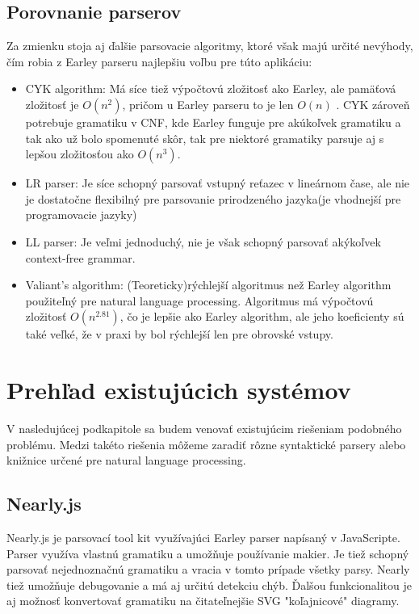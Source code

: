 \documentclass[12pt,a4paper]{report}
\theoremstyle{definition}
\theoremstyle{remark}
\begin{document}
\subsection{Porovnanie parserov}
Za zmienku stoja aj ďalšie parsovacie algoritmy, ktoré však majú určité nevýhody, čím robia z Earley parseru najlepšiu voľbu pre túto aplikáciu:
\begin{itemize}
\item CYK algorithm: Má síce tiež výpočtovú zložitosť ako Earley, ale pamäťová zložitosť je $O(n^2)$, pričom u Earley parseru to je len $O(n)$ \cite{complexity}. CYK zároveň potrebuje gramatiku v CNF, kde Earley funguje pre akúkoľvek gramatiku a tak ako už bolo spomenuté skôr, tak pre niektoré gramatiky parsuje aj s lepšou zložitosťou ako $O(n^3)$.
\item LR parser: Je síce schopný parsovať vstupný reťazec v lineárnom čase, ale nie je dostatočne flexibilný pre parsovanie prirodzeného jazyka(je vhodnejší pre programovacie jazyky)
\item LL parser: Je veľmi jednoduchý, nie je však schopný parsovať akýkoľvek context-free grammar.
\item Valiant’s algorithm: (Teoreticky)rýchlejší algoritmus než Earley algorithm použiteľný pre natural language processing. Algoritmus má výpočtovú zložitosť $O(n^{2.81})$, čo je lepšie ako Earley algorithm, ale jeho koeficienty sú také veľké, že v praxi by bol rýchlejší len pre obrovské vstupy.\cite{Tomita}
\end{itemize}

\section{Prehľad existujúcich systémov}
V nasledujúcej podkapitole sa budem venovať existujúcim riešeniam podobného problému. Medzi takéto riešenia môžeme zaradiť rôzne syntaktické parsery alebo knižnice určené pre natural language processing.

\subsection{Nearly.js}
Nearly.js\cite{nearley} je parsovací tool kit využívajúci Earley parser napísaný v JavaScripte. Parser využíva vlastnú gramatiku a umožňuje používanie makier. Je tiež schopný parsovať nejednoznačnú gramatiku a vracia v tomto prípade všetky parsy. Nearly tiež umožňuje debugovanie a má aj určitú detekciu chýb. Ďalšou funkcionalitou je aj možnosť konvertovať gramatiku na čitateľnejšie SVG "koľajnicové" diagramy.
\end{document}
